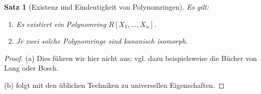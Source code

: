 \documentclass[a4paper, twoside, 11pt, ngerman]{report}
\theoremstyle{definistyle}
\newtheorem{satz}{Satz}[section]
\theoremstyle{remark}
\begin{document}
\begin{satz}[Existenz und Eindeutigkeit von Polynomringen]\label{satz:existenz_eindeutigkeit_polynomringe}
Es gilt:
\begin{enumerate}[label=(\alph*)]
    \item Es existiert ein Polynomring $R[X_1, \ldots, X_n]$.
    \item Je zwei solche Polynomringe sind kanonisch isomorph.
\end{enumerate}
\end{satz}

\begin{proof}
(a) Dies führen wir hier nicht aus; vgl. dazu beispielsweise die Bücher von Lang oder Bosch.

(b) folgt mit den üblichen Techniken zu universellen Eigenschaften.
\end{proof}
\end{document}
